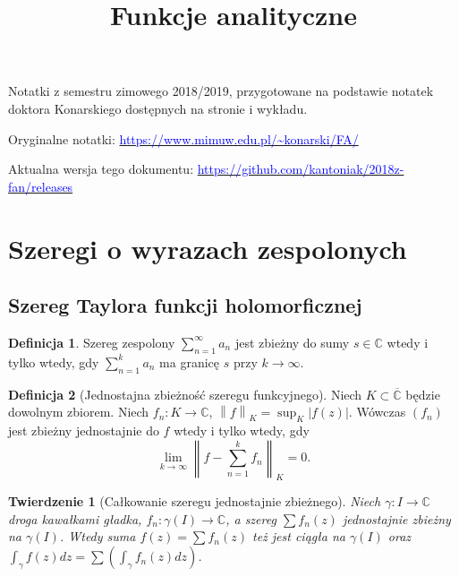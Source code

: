 \documentclass[11pt]{article}
\title{Funkcje analityczne}
\newcommand{\abs}[1]{\left|#1\right|} %
\newcommand{\norm}[1]{\left\lVert#1\right\rVert} %
\newcommand{\extcomplex}{\overline{\mathbb{C}}} %
\theoremstyle{plain}
\newtheorem*{theorem}{Twierdzenie}
\theoremstyle{definition}
\newtheorem*{definition}{Definicja}
\theoremstyle{remark}
\begin{document}
{\huge\bfseries\@title\par}
\vspace{0.2cm}
Notatki z semestru zimowego 2018/2019, przygotowane na podstawie notatek doktora Konarskiego dostępnych na stronie i wykładu.

Oryginalne notatki: \href{https://www.mimuw.edu.pl/~konarski/FA/}{\textcolor{blue}{https://www.mimuw.edu.pl/\textasciitilde konarski/FA/}}

Aktualna wersja tego dokumentu: \href{https://github.com/kantoniak/2018z-fan/releases}{\textcolor{blue}{https://github.com/kantoniak/2018z-fan/releases}}

{\small\listoftheorems[ignoreall,onlynamed={theorem,definition,remark,corollary}]}

\section{Szeregi o wyrazach zespolonych}

\subsection{Szereg Taylora funkcji holomorficznej}

\begin{definition}
  Szereg zespolony $\sum_{n=1}^{\infty} a_{n}$ jest zbieżny do sumy $ s \in \mathbb{C} $ wtedy i tylko wtedy, gdy $ \sum_{n=1}^{k} a_{n} $ ma granicę $ s $ przy $ k\to\infty $.
\end{definition}

\begin{definition}[Jednostajna zbieżność szeregu funkcyjnego]
  Niech $ K \subset \extcomplex $ będzie dowolnym zbiorem. Niech $ f_{n} \colon K \to \mathbb{C} $, $ \norm{f}_{K} = \sup_{K}\abs{f(z)} $. Wówczas $ (f_{n}) $ jest zbieżny jednostajnie do $ f $ wtedy i tylko wtedy, gdy
  $$ \lim_{k\to\infty} \norm{f - \sum_{n=1}^{k} f_{n}}_{K} = 0. $$
\end{definition}

\begin{theorem}[Całkowanie szeregu jednostajnie zbieżnego]
  Niech $ \gamma \colon I \to \mathbb{C} $ droga kawałkami gładka, $ f_{n} \colon \gamma(I) \to \mathbb{C} $, a szereg $ \sum f_{n}(z) $ jednostajnie zbieżny na $ \gamma(I) $. Wtedy suma $ f(z) = \sum f_{n}(z) $ też jest ciągła na $ \gamma(I) $ oraz $ \int_{\gamma} f(z) dz = \sum (\int_{\gamma} f_{n}(z) dz) $.
\end{theorem}
\end{document}
